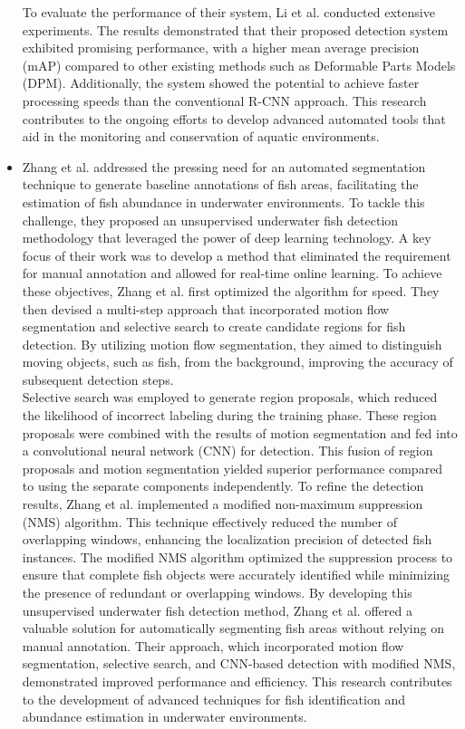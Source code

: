\begin{itemize}
    To evaluate the performance of their system, Li et al. conducted extensive experiments. The results demonstrated that their proposed detection system exhibited promising performance, with a higher mean average precision (mAP) compared to other existing methods such as Deformable Parts Models (DPM). Additionally, the system showed the potential to achieve faster processing speeds than the conventional R-CNN approach. This research contributes to the ongoing efforts to develop advanced automated tools that aid in the monitoring and conservation of aquatic environments.
    \item Zhang et al. \cite{zhang2016unsupervised} addressed the pressing need for an automated segmentation technique to generate baseline annotations of fish areas, facilitating the estimation of fish abundance in underwater environments. To tackle this challenge, they proposed an unsupervised underwater fish detection methodology that leveraged the power of deep learning technology. A key focus of their work was to develop a method that eliminated the requirement for manual annotation and allowed for real-time online learning. To achieve these objectives, Zhang et al. first optimized the algorithm for speed. They then devised a multi-step approach that incorporated motion flow segmentation and selective search to create candidate regions for fish detection. By utilizing motion flow segmentation, they aimed to distinguish moving objects, such as fish, from the background, improving the accuracy of subsequent detection steps.\\
    Selective search was employed to generate region proposals, which reduced the likelihood of incorrect labeling during the training phase. These region proposals were combined with the results of motion segmentation and fed into a convolutional neural network (CNN) for detection. This fusion of region proposals and motion segmentation yielded superior performance compared to using the separate components independently. To refine the detection results, Zhang et al. implemented a modified non-maximum suppression (NMS) algorithm. This technique effectively reduced the number of overlapping windows, enhancing the localization precision of detected fish instances. The modified NMS algorithm optimized the suppression process to ensure that complete fish objects were accurately identified while minimizing the presence of redundant or overlapping windows. By developing this unsupervised underwater fish detection method, Zhang et al. offered a valuable solution for automatically segmenting fish areas without relying on manual annotation. Their approach, which incorporated motion flow segmentation, selective search, and CNN-based detection with modified NMS, demonstrated improved performance and efficiency. This research contributes to the development of advanced techniques for fish identification and abundance estimation in underwater environments.

\end{itemize}
